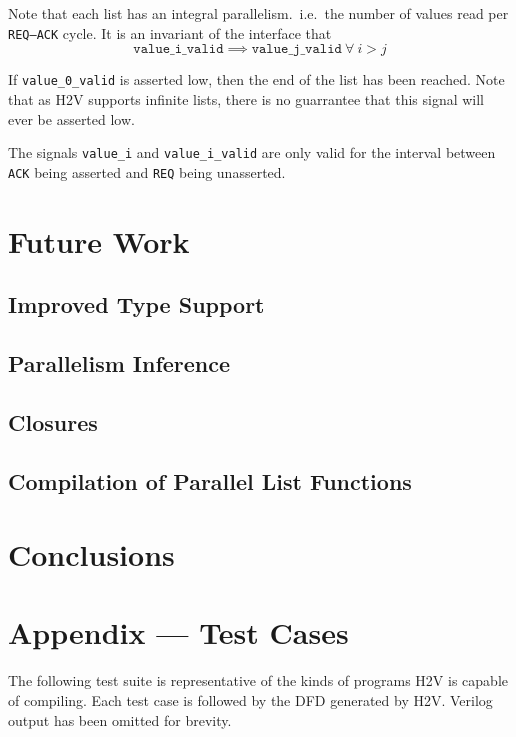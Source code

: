 \documentclass[english,onecolumn]{scrartcl}
\begin{document}
Note that each list has an integral parallelism.\ i.e.\ the number of values read per \texttt{REQ--ACK} cycle.
It is an invariant of the interface that
\[ \texttt{value\_i\_valid} \implies \texttt{value\_j\_valid}\ \forall\ i > j \]

If \texttt{value\_0\_valid} is asserted low, then the end of the list has been reached. Note that as H2V supports infinite lists,
there is no guarrantee that this signal will ever be asserted low.

The signals \texttt{value\_i} and \texttt{value\_i\_valid} are only valid
for the interval between \texttt{ACK} being asserted and \texttt{REQ} being unasserted.


\section{Future Work}

\subsection{Improved Type Support}

\subsection{Parallelism Inference}

\subsection{Closures}

\subsection{Compilation of Parallel List Functions}
\label{sec:parListComp}

\section{Conclusions}


\pagebreak{}
\appendix
\section{Appendix --- Test Cases}
The following test suite is representative of the kinds of programs H2V is capable of compiling. Each test case is followed by the
DFD generated by H2V. Verilog output has been omitted for brevity.
\end{document}
